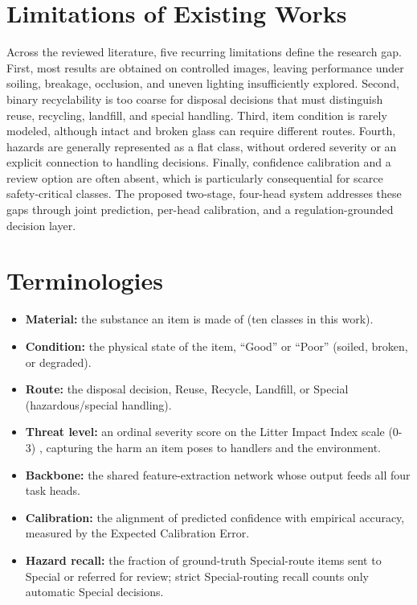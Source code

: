 \section{Limitations of Existing Works}
Across the reviewed literature, five recurring limitations define the research gap. First, most results are obtained on controlled images, leaving performance under soiling, breakage, occlusion, and uneven lighting insufficiently explored. Second, binary recyclability is too coarse for disposal decisions that must distinguish reuse, recycling, landfill, and special handling. Third, item condition is rarely modeled, although intact and broken glass can require different routes. Fourth, hazards are generally represented as a flat class, without ordered severity or an explicit connection to handling decisions. Finally, confidence calibration and a review option are often absent, which is particularly consequential for scarce safety-critical classes. The proposed two-stage, four-head system addresses these gaps through joint prediction, per-head calibration, and a regulation-grounded decision layer.

\section{Terminologies}
\begin{itemize}
    \item \textbf{Material:} the substance an item is made of (ten classes in this work).
    \item \textbf{Condition:} the physical state of the item, ``Good'' or ``Poor'' (soiled, broken, or degraded).
    \item \textbf{Route:} the disposal decision, Reuse, Recycle, Landfill, or Special (hazardous/special handling).
    \item \textbf{Threat level:} an ordinal severity score on the Litter Impact Index scale (0-3) \cite{lii}, capturing the harm an item poses to handlers and the environment.
    \item \textbf{Backbone:} the shared feature-extraction network whose output feeds all four task heads.
    \item \textbf{Calibration:} the alignment of predicted confidence with empirical accuracy, measured by the Expected Calibration Error.
    \item \textbf{Hazard recall:} the fraction of ground-truth Special-route items sent to Special or referred for review; strict Special-routing recall counts only automatic Special decisions.
\end{itemize}

